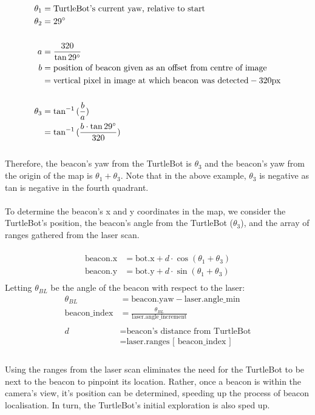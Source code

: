 \documentclass[titlepage,12pt,a4paper]{article}
\begin{document}
\begin{align*}
	\theta_1   &=  \text{TurtleBot's current yaw, relative to start} \\
	\theta_2   &=  29\degree \\
	\\
	a 	        &=  \frac{320}{\tan{29\degree}} \\ 
	b 	        &=  \text{position of beacon given as an offset from centre of image} \\
			&=  \text{vertical pixel in image at which beacon was detected} - 320\text{px} \\
	\\
	\theta_3   &= \tan^{-1}{(\frac{b}{a})} \\
		        &= \tan^{-1}{(\frac{b \cdot \tan{29\degree}}{320})} \\
\end{align*}
\\
Therefore, the beacon's yaw from the TurtleBot is $\theta_3$ and the beacon's yaw from the origin of the map is $\theta_1 + \theta_3$. Note that in the above example, $\theta_3$ is negative as tan is negative in the fourth quadrant.\\
\\
To determine the beacon's x and y coordinates in the map, we consider the TurtleBot's position, the beacon's angle from the TurtleBot ($\theta_3$), and the array of ranges gathered from the laser scan. \\
\\
\begin{align*}
	\text{beacon.x}		&=		\text{bot.x} + d \cdot \cos{(\theta_1 + \theta_3)} \\
	\text{beacon.y} 		&= 		\text{bot.y} + d \cdot \sin{(\theta_1 + \theta_3)} \\
\end{align*}
Letting $\theta_{BL}$ be the angle of the beacon with respect to the laser: \\
\begin{align*}
		\theta_{BL}	&= 		\text{beacon.yaw} - \text{laser.angle\_min} \\
   \text{beacon\_index}	&=		\frac{\theta_{BL}}{\text{laser.angle\_increment}} \\
   					 \\
				d 	&=		\text{beacon's distance from TurtleBot} \\
					&=		\text{laser.ranges [ beacon\_index ]}  \\
\end{align*}
\\
Using the ranges from the laser scan eliminates the need for the TurtleBot to be next to the beacon to pinpoint its location. Rather, once a beacon is within the camera's view, it's position can be determined, speeding up the process of beacon localisation. In turn, the TurtleBot's initial exploration is also sped up.
\end{document}
